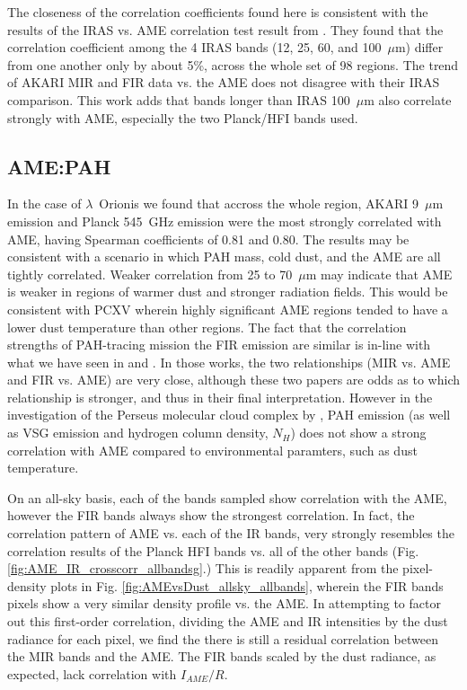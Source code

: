 \documentclass[preprint2,longabstract]{aastex}
\begin{document}
        The closeness of the correlation coefficients found here is consistent with the results of the IRAS vs. AME correlation test result from \cite{planckXV}. They found that the correlation coefficient among the 4 IRAS bands (12, 25, 60, and 100~$\mu$m) differ from one another only by about 5\%, across the whole set of 98 regions. The trend of AKARI MIR and FIR data vs. the AME does not disagree with their IRAS comparison. This work adds that bands longer than IRAS 100~$\mu$m also correlate strongly with AME, especially the two Planck/HFI bands used.

      \subsection{AME:PAH}

        In the case of $\lambda$~Orionis we found that accross the whole region, AKARI 9~$\mu$m emission and Planck 545~GHz emission were the most strongly correlated with AME, having Spearman coefficients of 0.81 and 0.80. The results may be consistent with a scenario in which PAH mass, cold dust, and the AME are all tightly correlated. Weaker correlation from 25 to 70~$\mu$m may indicate that AME is weaker in regions of warmer dust and stronger radiation fields. This would be consistent with PCXV wherein highly significant AME regions tended to have a lower dust temperature than other regions. The fact that the correlation strengths of PAH-tracing mission the FIR emission are similar is in-line with what we have seen in \cite{ysard10b} and \cite{hensley16}. In those works, the two relationships (MIR vs. AME and FIR vs. AME) are very close, although these two papers are odds as to which relationship is stronger, and thus in their final interpretation. However in the investigation of the Perseus molecular cloud complex by \cite{tibbs11}, PAH emission (as well as VSG emission and hydrogen column density, $N_{H}$) does not show a strong correlation with AME compared to environmental paramters, such as dust temperature.

        On an all-sky basis, each of the bands sampled show correlation with the AME, however the FIR bands always show the strongest correlation. In fact, the correlation pattern of AME vs. each of the IR bands, very strongly resembles the correlation results of the Planck HFI bands vs. all of the other bands (Fig. \ref{fig:AME_IR_crosscorr_allbandsg}.) This is readily apparent from the pixel-density plots in Fig. \ref{fig:AMEvsDust_allsky_allbands}, wherein the FIR bands pixels show a very similar density profile vs. the AME. In attempting to factor out this first-order correlation, dividing the AME and IR intensities by the dust radiance for each pixel, we find the there is still a residual correlation between the MIR bands and the AME. The FIR bands scaled by the dust radiance, as expected, lack correlation with $I_{AME}/R$.
\end{document}
